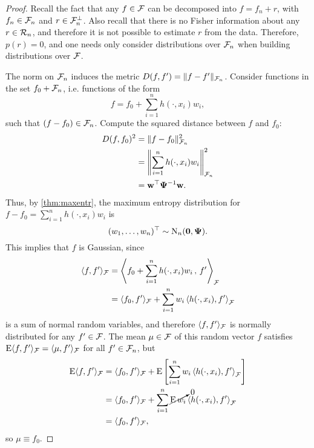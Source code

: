 \begin{proof}
  Recall the fact that any $f \in {\mathcal F}$ can be decomposed into $f = f_n + r$, with $f_n \in {\mathcal F}_n$ and $r \in {\mathcal F}_n^\bot$.
  Also recall that there is no Fisher information about any $r \in {\mathcal R}_n$, and therefore it is not possible to estimate $r$ from the data.
  Therefore, $p(r) = 0$, and one needs only consider distributions over ${\mathcal F}_n$ when building distributions over ${\mathcal F}$.
  
  The norm on ${\mathcal F}_n$ induces the metric $D(f,f') = \lVert f - f'\rVert_{{\mathcal F}_n}$.
  Consider functions in the set $f_0 + {\mathcal F}_n$, i.e. functions of the form
  \begingroup
  \setlength{\abovedisplayskip}{8pt}
  \setlength{\belowdisplayskip}{7pt}
  \[
    f = f_0 + \sum_{i=1}^n h(\cdot,x_i)w_i,
  \]
  \endgroup
  such that $(f - f_0) \in {\mathcal F}_n$. 
  Compute the squared distance between $f$ and $f_0$:
  \begingroup
  \setlength{\abovedisplayskip}{10pt}
  \setlength{\belowdisplayskip}{6pt}
  \begin{align*}
    D(f,f_0)^2 
    &= \lVert f - f_0\rVert_{{\mathcal F}_n}^2 \\
    &= \left\Vert \sum_{i=1}^n h(\cdot,x_i)w_i \right\Vert_{{\mathcal F}_n}^2 \\
    &= {\mathbf w} ^\top{\bm\Psi}^{-1} {\mathbf w}.
  \end{align*}
  \endgroup
  Thus, by \cref{thm:maxentr}, the maximum entropy distribution for $f - f_0 = \sum_{i=1}^n h(\cdot,x_i)w_i$ is
  \[
    (w_1,\dots,w_n)^\top \sim \operatorname{N}_n({\mathbf 0},{\bm\Psi}).
  \]
  This implies that $f$ is Gaussian, since
  \begin{align*}
    \langle f,f' \rangle_{{\mathcal F}}
    &= \left\langle f_0 + \sum_{i=1}^n h(\cdot,x_i)w_i \,,\, f' \right\rangle_{{\mathcal F}} \\
    &= \langle f_0,f'\rangle_{\mathcal F} +  \sum_{i=1}^n w_i \left\langle  h(\cdot,x_i), f' \right\rangle_{{\mathcal F}}  
  \end{align*}
  is a sum of normal random variables, and therefore $\langle f,f' \rangle_{{\mathcal F}}$ is normally distributed for any $f' \in {\mathcal F}$.
  The mean $\mu\in{\mathcal F}$ of this random vector $f$ satisfies $\operatorname{E}\langle f,f'\rangle_{{\mathcal F}}  = \langle\mu,f'\rangle_{{\mathcal F}}$ for all $f'\in{\mathcal F}_n$, but
  \vspace{-1.1em}
  \begin{align*}
    \operatorname{E}\langle f,f'\rangle_{{\mathcal F}}  
    &= \langle f_0,f' \rangle_{{\mathcal F}} + 
    \operatorname{E} \left[ \sum_{i=1}^n w_i \left\langle  h(\cdot,x_i), f' \right\rangle_{{\mathcal F}} \right] \\
    &= \langle f_0,f' \rangle_{{\mathcal F}} + 
     \sum_{i=1}^n \cancelto{0}{\operatorname{E} w_i} \left\langle  h(\cdot,x_i), f' \right\rangle_{{\mathcal F}} \\
    &= \langle f_0,f' \rangle_{{\mathcal F}},
  \end{align*}
  so $\mu \equiv f_0$. 
  

\end{proof}

